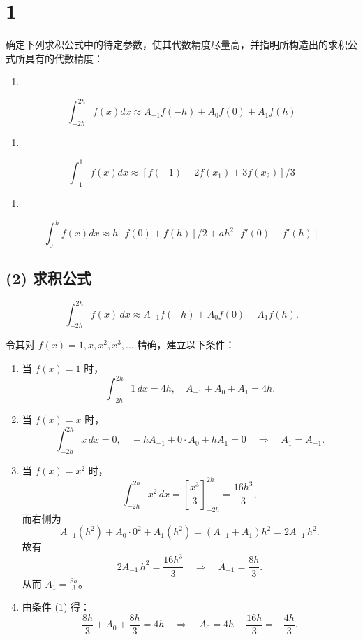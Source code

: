 \documentclass[11pt]{article}
\providecommand{\tightlist}{%
      \setlength{\itemsep}{0pt}\setlength{\parskip}{0pt}}
\begin{document}
    \section{1}\label{section}

确定下列求积公式中的待定参数，使其代数精度尽量高，并指明所构造出的求积公式所具有的代数精度：

\begin{enumerate}
\def\labelenumi{(\arabic{enumi})}
\setcounter{enumi}{1}
\tightlist
\item
\end{enumerate}

\[
\int_{-2h}^{2h} f(x) dx \approx A_{-1}f(-h) + A_0f(0) + A_1f(h)
\]

\begin{enumerate}
\def\labelenumi{(\arabic{enumi})}
\setcounter{enumi}{2}
\tightlist
\item
\end{enumerate}

\[
\int_{-1}^1 f(x)dx \approx \left[ f(-1) + 2f(x_1) + 3f(x_2) \right] / 3
\]

\begin{enumerate}
\def\labelenumi{(\arabic{enumi})}
\setcounter{enumi}{3}
\tightlist
\item
\end{enumerate}

\[
\int_{0}^hf(x)dx \approx h[f(0) + f(h)] / 2 + ah^2[f'(0) - f'(h)]
\]

    \subsection{(2) 求积公式}\label{ux6c42ux79efux516cux5f0f}

\[
\int_{-2h}^{2h} f(x)\,dx \approx A_{-1} f(-h) + A_0 f(0) + A_1 f(h).
\]

令其对 \(f(x)=1,x,x^2,x^3,\dots\) 精确，建立以下条件：

\begin{enumerate}
\def\labelenumi{\arabic{enumi}.}
\item
  当 \(f(x)=1\) 时， \[
  \int_{-2h}^{2h}1\,dx=4h,\quad
  A_{-1}+A_0+A_1=4h.
  \]
\item
  当 \(f(x)=x\) 时， \[
  \int_{-2h}^{2h}x\,dx=0,\quad
  -hA_{-1}+0\cdot A_0+hA_1=0 \quad\Longrightarrow\quad A_1=A_{-1}.
  \]
\item
  当 \(f(x)=x^2\) 时， \[
  \int_{-2h}^{2h}x^2\,dx = \left[\frac{x^3}{3}\right]_{-2h}^{2h} = \frac{16h^3}{3},
  \] 而右侧为 \[
  A_{-1}(h^2)+A_0\cdot0^2+A_1(h^2) = (A_{-1}+A_{1})h^2=2A_{-1}\,h^2.
  \] 故有 \[
  2A_{-1}\,h^2 = \frac{16h^3}{3}\quad\Longrightarrow\quad A_{-1}=\frac{8h}{3}.
  \] 从而 \(A_1=\frac{8h}{3}\)。
\item
  由条件 (1) 得： \[
  \frac{8h}{3} + A_0 + \frac{8h}{3} = 4h
  \quad\Longrightarrow\quad A_0=4h-\frac{16h}{3}=-\frac{4h}{3}.
  \]
\end{enumerate}
\end{document}
